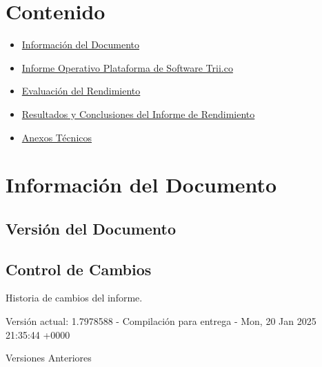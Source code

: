 \documentclass[
  paper=a4,
  ,captions=tableheading
]{scrartcl}
\providecommand{\tightlist}{%
  \setlength{\itemsep}{0pt}\setlength{\parskip}{0pt}}
\renewenvironment{quote}{\begin{customblockquote}\list{}{\rightmargin=0em\leftmargin=0em}%
\item\relax\color{blockquote-text}\ignorespaces}{\unskip\unskip\endlist\end{customblockquote}}
\begin{document}



\section{Contenido}\label{sec:contenido}

\begin{itemize}
\tightlist
\item
  \hyperref[informaciuxf3n-del-documento]{Información del Documento}
\item
  \hyperref[informe-operativo-plataforma-de-software-trii.co]{Informe
  Operativo Plataforma de Software Trii.co}
\item
  \hyperref[evaluaciuxf3n-del-rendimiento]{Evaluación del Rendimiento}
\item
  \hyperref[resultados-y-conclusiones-del-informe-de-rendimiento]{Resultados
  y Conclusiones del Informe de Rendimiento}
\item
  \hyperref[anexos-tuxe9cnicos]{Anexos Técnicos}
\end{itemize}

\newpage

\section{Información del
Documento}\label{sec:informaciuxf3n-del-documento}

\subsection{Versión del Documento}\label{sec:versiuxf3n-del-documento}

\begin{quote}
\end{quote}

\subsection{Control de Cambios}\label{sec:control-de-cambios}

Historia de cambios del informe.

Versión actual: 1.7978588 - Compilación para entrega - Mon, 20 Jan 2025
21:35:44 +0000

Versiones Anteriores
\end{document}
